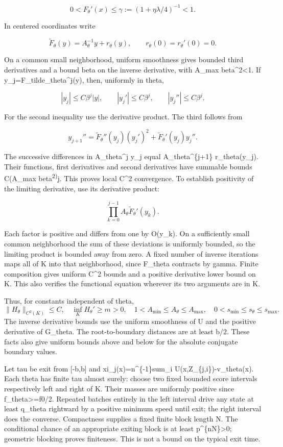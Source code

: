\[
0<F_\theta'(x)\le \gamma:=(1+\eta\lambda/4)^{-1}<1.
\]

In centered coordinates write

\[
\widetilde F_\theta(y)=A_\theta^{-1}y+r_\theta(y),
\qquad r_\theta(0)=r_\theta'(0)=0.
\]

On a common small neighborhood, uniform smoothness gives bounded third
derivatives and a bound beta on the inverse derivative, with A\_max
beta\^{}2\textless1. If y\_j=F\_tilde\_theta\^{}j(y), then, uniformly in
theta,

\[
|y_j|\le C\beta^j|y|,\qquad
|y_j'|\le C\beta^j,\qquad |y_j''|\le C\beta^j.
\]

For the second inequality use the derivative product. The third follows
from

\[
y_{j+1}''=\widetilde F_\theta''(y_j)(y_j')^2
             +\widetilde F_\theta'(y_j)y_j''.
\]

The successive differences in A\_theta\^{}j y\_j equal
A\_theta\^{}\{j+1\} r\_theta(y\_j). Their functions, first derivatives
and second derivatives have summable bounds C(A\_max
beta\textsuperscript{2)}j. This proves local C\^{}2 convergence. To
establish positivity of the limiting derivative, use its derivative
product:

\[
\prod_{k=0}^{j-1} A_\theta\widetilde F_\theta'(y_k).
\]

Each factor is positive and differs from one by
O(\textbar y\_k\textbar). On a sufficiently small common neighborhood
the sum of these deviations is uniformly bounded, so the limiting
product is bounded away from zero. A fixed number of inverse iterations
maps all of K into that neighborhood, since F\_theta contracts by gamma.
Finite composition gives uniform C\^{}2 bounds and a positive derivative
lower bound on K. This also verifies the functional equation wherever
its two arguments are in K.

Thus, for constants independent of theta, \[
\|H_\theta\|_{C^2(K)}\le C,\quad \inf_K H_\theta'\ge m>0,
\quad 1<A_{\min}\le A_\theta\le A_{\max},\quad
0<s_{\min}\le s_\theta\le s_{\max}.
\tag{L.3}
\] The inverse derivative bounds use the uniform smoothness of U and the
positive derivative of G\_theta. The root-to-boundary distances are at
least b/2. These facts also give uniform bounds above and below for the
absolute conjugate boundary values.

Let tau be exit from {[}-b,b{]} and xi\_j(x)=n\^{}\{-1\}sum\_i
U(x,Z\_\{j,i\})-v\_theta(x). Each theta has finite tau almost surely:
choose two fixed bounded score intervals respectively left and right of
K. Their masses are uniformly positive since f\_theta\textgreater=f0/2.
Repeated batches entirely in the left interval drive any state at least
q\_theta rightward by a positive minimum speed until exit; the right
interval does the converse. Compactness supplies a fixed finite block
length N. The conditional chance of an appropriate exiting block is at
least p\^{}\{nN\}\textgreater0; geometric blocking proves finiteness.
This is not a bound on the typical exit time.

